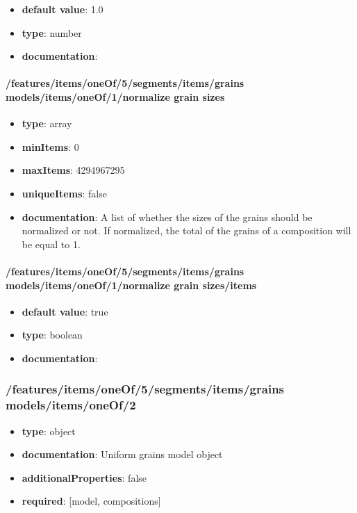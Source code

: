 \begin{itemize}\item {\bf default value}: 1.0
\item {\bf type}: number
\item {\bf documentation}: 
\end{itemize}\paragraph{/features/items/oneOf/5/segments/items/grains models/items/oneOf/1/normalize grain sizes}
\begin{itemize}\item {\bf type}: array
\item {\bf minItems}: 0
\item {\bf maxItems}: 4294967295
\item {\bf uniqueItems}: false
\item {\bf documentation}: A list of whether the sizes of the grains should be normalized or not. If normalized, the total of the grains of a composition will be equal to 1.
\end{itemize}\paragraph{/features/items/oneOf/5/segments/items/grains models/items/oneOf/1/normalize grain sizes/items}
\begin{itemize}\item {\bf default value}: true
\item {\bf type}: boolean
\item {\bf documentation}: 
\end{itemize}\subsubsection{/features/items/oneOf/5/segments/items/grains models/items/oneOf/2}
\begin{itemize}\item {\bf type}: object
\item {\bf documentation}: Uniform grains model object
\item {\bf additionalProperties}: false
\item {\bf required}: [model, compositions]\end{itemize}
